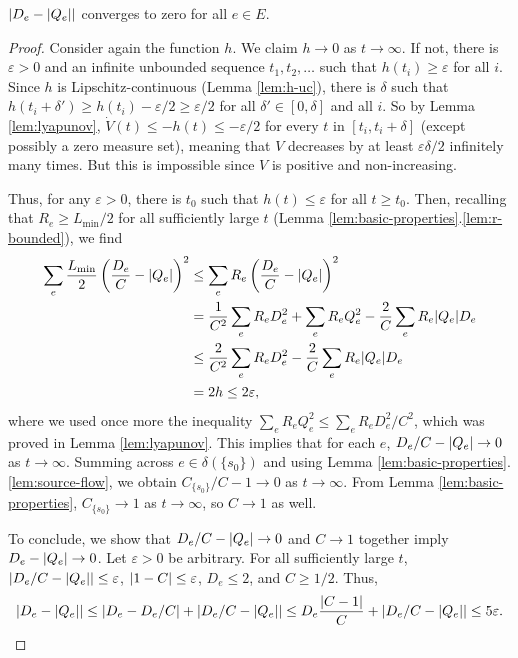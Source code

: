 \documentclass[11pt,a4paper]{article}
\newcommand{\Lmin}{\ensuremath{L_{\mathrm{min}}}}
\begin{document}
\begin{lemma}\label{lem: Q minus D} $| D_e - | Q_e | |$ converges to zero
for all $e \in E$. \end{lemma}\begin{proof}
Consider again the function $h$. We claim $h \to 0$ as $t \to \infty$. 
If not, there is $\varepsilon > 0$ and an infinite unbounded sequence $t_1,
t_2, \dots$ such that $h(t_i) \ge \varepsilon$ for all $i$. Since $h$ is
Lipschitz-continuous (Lemma \ref{lem:h-uc}), there is $\delta$ such that $h(t_i
+ \delta') \ge h(t_i) - \varepsilon/2 \ge \varepsilon/2$ for all $\delta' \in
[0,\delta]$ and all $i$. So by Lemma \ref{lem:lyapunov}, $\dot{V}(t) \le -h(t)
\le -\varepsilon/2$ for every $t$ in $[t_i,t_i+\delta]$ (except possibly a zero
measure set), meaning that $V$ decreases by at least $\varepsilon\delta/2$
infinitely many times. But this is impossible since $V$ is positive and
non-increasing.  


Thus, for any $\varepsilon>0$, there is $t_0$ such that $h(t) \le \varepsilon$ for all $t \ge t_0$.  Then, recalling that $R_e \ge \Lmin/2$ for all sufficiently large $t$ (Lemma \ref{lem:basic-properties}.\ref{lem:r-bounded}), we find 
\begin{align*}
\sum_e \frac{\Lmin}{2} \left( \frac{D_e}{C} - \abs{Q_e} \right)^2 
&\le 
\sum_e R_e \left( \frac{D_e}{C} - \abs{Q_e} \right)^2 \\
&= \frac{1}{C^2} \sum_e R_e D_e^2 + \sum_e R_e Q_e^2 - \frac{2}{C} \sum_e R_e \abs{Q_e} D_e  \\
&\le \frac{2}{C^2} \sum_e R_e D_e^2 - \frac{2}{C} \sum_e R_e \abs{Q_e} D_e \\
&= 2 h \le 2 \varepsilon, 
\end{align*}
where we used once more the inequality $\sum_e R_e Q_e^2 \le \sum_e R_e D_e^2/C^2$, which was proved in Lemma \ref{lem:lyapunov}.  
This implies that for each $e$, $D_e/C - | Q_e | \to 0$ as $t \to
\infty$. Summing across $e \in \delta(\{s_0\})$ and using Lemma
\ref{lem:basic-properties}.\ref{lem:source-flow}, we obtain $C_{\{s_0\}}/C - 1
\to 0$ as $t \to \infty$.  From Lemma \ref{lem:basic-properties}, $C_{\{s_0\}}
\to 1$ as $t \to \infty$, so $C \to 1$ as well. 

To conclude, we show that $D_e/C - | Q_e | \to 0$ and $C \to 1$ together
imply $D_e - | Q_e | \to 0$. Let $\varepsilon > 0$ be arbitrary. For all
sufficiently large $t$, $| D_e/C - | Q_e | | \le \varepsilon$, $| 1 - C | \le
\varepsilon$, $D_e \le 2$, and $C \ge 1/2$. Thus,
\[ | D_e - | Q_e | | \le | D_e - D_e/C |+ | D_e/C - | Q_e | | \le D_e
\frac{| C - 1 |}{C} + | D_e/C - | Q_e | | \le 5 \varepsilon.\]
\Lnegskip\end{proof}
\end{document}
